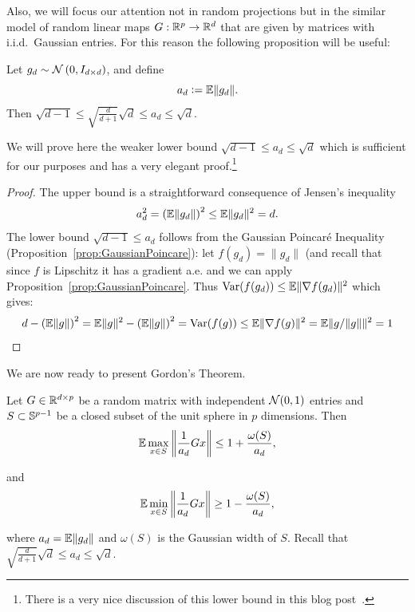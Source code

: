 Also, we will focus our attention not in random projections but in the similar model of random linear maps $G:\mathbb{R}^{p}\to\mathbb{R}^{d}$ that are given by matrices with i.i.d.\ Gaussian entries. For this reason the following proposition will be useful:

\begin{proposition}
Let $g_d\sim  \mathcal{N}\left(0,I_{d\times d}\right)$, and define
\[
a_d\mathrel{\mathop:}= \mathbb{E}\|g_d\|.
\]
Then $\sqrt{d-1}\leq\sqrt{\frac{d}{d+1}}\sqrt{d}\leq a_d\leq \sqrt{d}$.
\end{proposition}
We will prove here the weaker lower bound $\sqrt{d-1}\leq a_d\leq \sqrt{d}$ which is sufficient for our purposes and has a very elegant proof.\footnote{There is a very nice discussion of this lower bound in this blog post~\cite{Epperly_blog_gaussiannorm}.} 
\begin{proof}
The upper bound is a straightforward consequence of Jensen's inequality $$a_d^2=\left(\mathbb{E}\|g_d\|\right)^2 \leq \mathbb{E}\|g_d\|^2 =d.$$
The lower bound $\sqrt{d-1}\leq a_d$ follows from the Gaussian Poincar\'e Inequality (Proposition~\ref{prop:GaussianPoincare}):
let $f(g_d)=\|g_d\|$ (and recall that since $f$ is Lipschitz it has a gradient a.e. and we can apply Proposition~\ref{prop:GaussianPoincare}. Thus $\operatorname{Var}(f(g_d)) \leq \mathbb{E} \| \nabla f(g_d) \|^2$ which gives: $$d - \left(\mathbb{E}\|g\|\right)^2 =  \mathbb{E}\|g\|^2 - \left(\mathbb{E}\|g\|\right)^2 = \operatorname{Var}(f(g)) \leq \mathbb{E} \| \nabla f(g) \|^2 = \mathbb{E} \| g/\|g\| \|^2 = 1$$
\end{proof}


We are now ready to present Gordon's Theorem.

\begin{theorem}\label{GordonsTheorem}
Let $G\in\mathbb{R}^{d\times p}$ be a random matrix with independent $\mathcal{N}(0,1)$ entries and $S\subset \mathbb{S}^{p-1}$ be a closed subset of the unit sphere in $p$ dimensions. Then
\begin{equation}\label{eq:gordon1}   
\mathbb{E} \max_{x\in S} \left\|\frac1{a_d}Gx\right\| \leq 1 + \frac{\omega(S)}{a_d},  
\end{equation}

and
\begin{equation}   \label{eq:gordon2}  
\mathbb{E} \min_{x\in S} \left\|\frac1{a_d}Gx\right\| \geq 1 - \frac{\omega(S)}{a_d},
\end{equation}

where $a_d = \mathbb{E}\|g_d\|$ and $\omega(S)$ is the Gaussian width of $S$. Recall that $\sqrt{\frac{d}{d+1}}\sqrt{d}\leq a_d\leq \sqrt{d}$.
\end{theorem}


